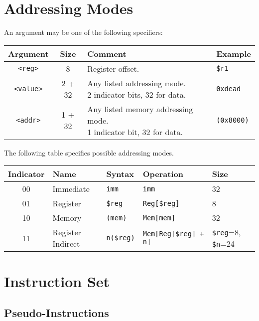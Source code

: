 \documentclass[10pt]{article}
\begin{document}
    \section{Addressing Modes}\label{sec:addressing-modes}

    An argument may be one of the following specifiers:

    \medskip
    \begin{tabular}{|c|c|l|l|}
        \hline
        \textbf{Argument} & \textbf{Size} & \textbf{Comment} & \textbf{Example} \\
        \hline
        \texttt{<reg>} & 8 & Register offset. & \texttt{\$r1} \\
        \hline
        \texttt{<value>} & 2 + 32 & \makecell[l]{Any listed addressing mode.\\%
        2 indicator bits, 32 for data.} & \texttt{0xdead} \\
        \hline
        \texttt{<addr>} & 1 + 32 & \makecell[l]{Any listed memory addressing mode.\\%
        1 indicator bit, 32 for data.} & \texttt{(0x8000)} \\
        \hline
    \end{tabular}
    \medskip

    The following table specifies possible addressing modes.

    \medskip
    \begin{tabular}{|c|l|l|l|l|}
        \hline
        \textbf{Indicator} & \textbf{Name} & \textbf{Syntax} & \textbf{Operation} & \textbf{Size} \\
        \hline
        00 & Immediate & \texttt{imm} & \texttt{imm} & 32 \\
        01 & Register & \texttt{\$reg} & \texttt{Reg[\$reg]} & 8 \\
        10 & Memory & \texttt{(mem)} & \texttt{Mem[mem]} & 32\\
        11 & Register Indirect & \texttt{n(\$reg)} & \texttt{Mem[Reg[\$reg] + n]} & \texttt{\$reg}=8, \texttt{\$n}=24 \\
        \hline
    \end{tabular}

    \section{Instruction Set}\label{sec:instruction-set}

    

    \subsection{Pseudo-Instructions}\label{subsec:pseudo-instructions}
\end{document}
